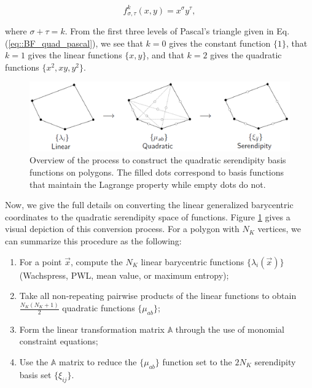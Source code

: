 \begin{equation}
\label{eq::BF_quad_monomial}
f_{\sigma, \tau}^k (x, y) = x^{\sigma} y^{\tau} ,
\end{equation}

\noindent where $\sigma + \tau = k$. From the first three levels of Pascal's triangle given in Eq. (\ref{eq::BF_quad_pascal}), we see that $k=0$ gives the constant function $\{ 1 \}$, that $k=1$ gives the linear functions $\{ x,y \}$, and that $k=2$ gives the quadratic functions $\{ x^2,xy,y^2 \}$.

\begin{figure}[hbt]
\centering
\includegraphics[width=\textwidth]{figures/sec_BF/linear_to_quad_process.png}
\caption{Overview of the process to construct the quadratic serendipity basis functions on polygons. The filled dots correspond to basis functions that maintain the Lagrange property while empty dots do not.}
\label{fig::BF_2D_quad_process}
\end{figure}

Now, we give the full details on converting the linear generalized barycentric coordinates to the quadratic serendipity space of functions. Figure \ref{fig::BF_2D_quad_process} gives a visual depiction of this conversion process. For a polygon with $N_K$ vertices, we can summarize this procedure as the following:

\begin{enumerate}
\item For a point $\vec{x}$, compute the $N_K$ linear barycentric functions $\{ \lambda_i (\vec{x}) \}$ (Wachspress, PWL, mean value, or maximum entropy);
\item Take all non-repeating pairwise products of the linear functions to obtain $\frac{N_K(N_K+1)}{2}$ quadratic functions $\{ \mu_{ab} \}$;
\item Form the linear transformation matrix $\mathbb{A}$ through the use of monomial constraint equations;
\item Use the $\mathbb{A}$ matrix to reduce the $\{ \mu_{ab} \}$ function set to the $2 N_K$ serendipity basis set $\{ \xi_{ij} \}$.
\end{enumerate}

